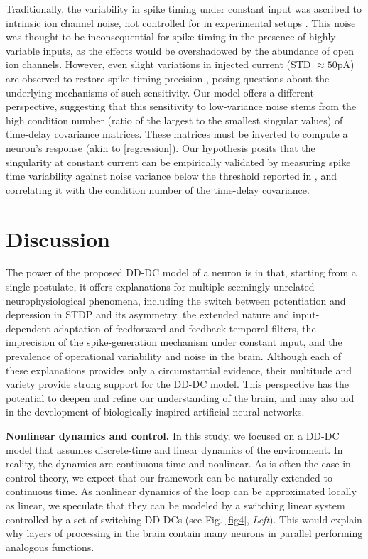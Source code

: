 \documentclass[9pt,twocolumn,twoside]{pnas-new}
\begin{document}
Traditionally, the variability in spike timing under constant input was ascribed to intrinsic ion channel noise, not controlled for in experimental setups \citep{schneidman1998ion}. This noise was thought to be inconsequential for spike timing in the presence of highly variable inputs, as the effects would be overshadowed by the abundance of open ion channels. However, even slight variations in injected current (STD $\approx 50$pA) are observed to restore spike-timing precision \citep{rauch_lacamera_fusi2003noise}, posing questions about the underlying mechanisms of such sensitivity. Our model offers a different perspective, suggesting that this sensitivity to low-variance noise stems from the high condition number (ratio of the largest to the smallest singular values) of time-delay covariance matrices. These matrices must be inverted to compute a neuron's response (akin to \eqref{regression}). Our hypothesis posits that the singularity at constant current can be empirically validated by measuring spike time variability against noise variance below the threshold reported in \citep{mainen1995reliability}, and correlating it with the condition number of the time-delay covariance.

\section*{Discussion}

The power of the proposed DD-DC model of a neuron is in that, starting from a single postulate, it offers explanations for multiple seemingly unrelated neurophysiological phenomena, including the switch between potentiation and depression in STDP and its asymmetry, the extended nature and input-dependent adaptation of feedforward and feedback temporal filters, the imprecision of the spike-generation mechanism under constant input, and the prevalence of operational variability and noise in the brain. Although each of these explanations provides only a circumstantial evidence, their multitude and variety provide strong support for the DD-DC model. This perspective has the potential to deepen and refine our understanding of the brain, and may also aid in the development of biologically-inspired artificial neural networks.

{\bf Nonlinear dynamics and control.} In this study, we focused on a DD-DC model that assumes discrete-time and linear dynamics of the environment. In reality, the dynamics are continuous-time and nonlinear. As is often the case in control theory, we expect that our framework can be naturally extended to continuous time. As nonlinear dynamics of the loop can be approximated locally as linear, we speculate that they can be modeled by a switching linear system controlled by a set of switching DD-DCs (see Fig. \ref{fig4}, \textit{Left}). This would explain why layers of processing in the brain contain many neurons in parallel performing analogous functions. 
\end{document}
